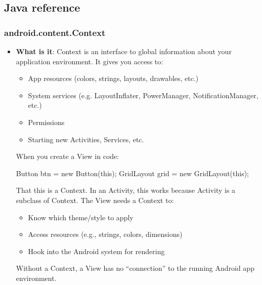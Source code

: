 \documentclass{report}
\begin{document}
    \pagebreak 
    \subsection{Java reference}
    \bigbreak \noindent 
    \subsubsection{android.content.Context}
    \begin{itemize}
        \item \textbf{What is it}: Context is an interface to global information about your application environment. It gives you access to:
            \begin{itemize}
                \item App resources (colors, strings, layouts, drawables, etc.)
                \item System services (e.g. LayoutInflater, PowerManager, NotificationManager, etc.)
                \item Permissions
                \item Starting new Activities, Services, etc.
            \end{itemize}
            \bigbreak \noindent 
            When you create a View in code:
            \bigbreak \noindent 
            \begin{javacode}
                Button btn = new Button(this);
                GridLayout grid = new GridLayout(this);
            \end{javacode}
            \bigbreak \noindent 
            That this is a Context. In an Activity, this works because Activity is a subclass of Context.
            \bigbreak \noindent 
            The View needs a Context to:
            \begin{itemize}
                \item Know which theme/style to apply
                \item Access resources (e.g., strings, colors, dimensions)
                \item Hook into the Android system for rendering
            \end{itemize}
            Without a Context, a View has no “connection” to the running Android app environment.
    \end{itemize}


    \pagebreak \bigbreak \noindent 
\end{document}
